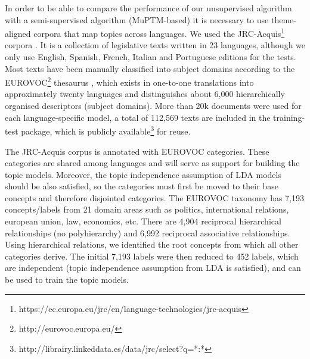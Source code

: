 In order to be able to compare the performance of our unsupervised algorithm with a semi-supervised algorithm (MuPTM-based) it is necessary to use theme-aligned corpora that map topics across languages. We used the JRC-Acquis\footnote{https://ec.europa.eu/jrc/en/language-technologies/jrc-acquis} corpora \citep{Steinberger2006}. It is a collection of legislative texts written in 23 languages, although we only use English, Spanish,  French, Italian and Portuguese editions for the tests. Most texts have been manually classified into subject domains according to the EUROVOC\footnote{http://eurovoc.europa.eu/} thesaurus \citep{Eurovoc1995}, which exists in one-to-one translations into approximately twenty languages and distinguishes about 6,000 hierarchically organised descriptors (subject domains). More than 20k documents were used for each language-specific model, a total of 112,569 texts are included in the training-test package, which is publicly available\footnote{http://librairy.linkeddata.es/data/jrc/select?q=*:*} for reuse.

The JRC-Acquis corpus is annotated with EUROVOC categories. These categories are shared among languages and will serve as support for building the topic models. Moreover, the topic independence assumption \citep{Blei2003} of LDA models should be also satisfied, so the categories must first be moved to their base concepts and therefore disjointed categories. The EUROVOC taxonomy has 7,193 concepts/labels from 21 domain areas such as politics, international relations, european union, law, economics, etc. There are 4,904 reciprocal hierarchical relationships (no polyhierarchy) and 6,992 reciprocal associative relationships. Using hierarchical relations, we identified the root concepts from which all other categories derive. The initial 7,193 labels were then reduced to 452 labels, which are independent (topic independence assumption from LDA is satisfied), and can be used to train the topic models. 

